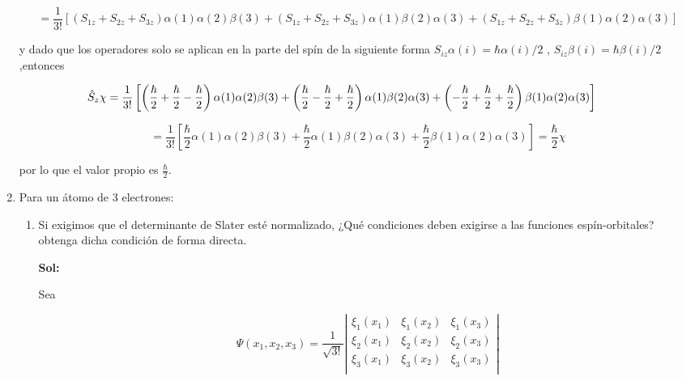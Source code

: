 \documentclass[12pt,a4paper]{article}
\begin{document}
\begin{enumerate}
    
    \begin{equation*}
        = \frac{1}{3!} [(S_{1z} + S_{2z} + S_{3z})\alpha (1) \alpha (2) \beta (3) + (S_{1z} + S_{2z} + S_{3z})\alpha (1) \beta(2) \alpha(3) +(S_{1z} + S_{2z} + S_{3z}) \beta(1) \alpha(2) \alpha(3)]
    \end{equation*}
    
    
    y dado que los operadores solo se aplican en la parte del spín de la siguiente forma $S_{iz} \alpha(i)= \hbar \alpha(i)/2 $ , $S_{iz} \beta(i) = \hbar \beta(i)/2$,entonces
    
    
    \begin{equation*}
        \hspace{-1cm}\hat{S}_z \chi = \frac{1}{3!} \left[\left(\frac{\hbar}{2} + \frac{\hbar}{2} - \frac{\hbar}{2}\right) \alpha (1) \alpha (2) \beta (3) + \left(\frac{\hbar}{2} - \frac{\hbar}{2} + \frac{\hbar}{2}\right) \alpha (1) \beta(2) \alpha(3) +\left(-\frac{\hbar}{2} + \frac{\hbar}{2} + \frac{\hbar}{2}\right) \beta(1) \alpha(2) \alpha(3)\right]
    \end{equation*}
    
    \begin{equation*}
         = \frac{1}{3!} \left[\frac{\hbar}{2} \alpha (1) \alpha (2) \beta (3) + \frac{\hbar}{2}\alpha (1) \beta(2) \alpha(3) +\frac{\hbar}{2} \beta(1) \alpha(2) \alpha(3)\right] = \frac{\hbar}{2} \chi
    \end{equation*}
    
    por lo que el valor propio es $\frac{\hbar}{2}$.






\item Para un átomo de 3 electrones:

\begin{enumerate}
    \item Si exigimos que el determinante de Slater esté normalizado, ¿Qué condiciones deben exigirse a las funciones espín-orbitales? obtenga dicha condición de forma directa.
    
    \textbf{Sol:}
    
    Sea
    
    \begin{equation*}
        \Psi(x_1,x_2,x_3) = \frac{1}{\sqrt{3!}} \left| \begin{matrix}
        \xi_1(x_1) & \xi_1 (x_2) & \xi_1 (x_3) \\
        \xi_2 (x_1) & \xi_2 (x_2) &\xi_2 (x_3) \\
        \xi_3 (x_1) & \xi_3 (x_2) & \xi_3 (x_3) \\
        \end{matrix}\right|
    \end{equation*}
    

\end{enumerate}
\end{enumerate}
\end{document}
